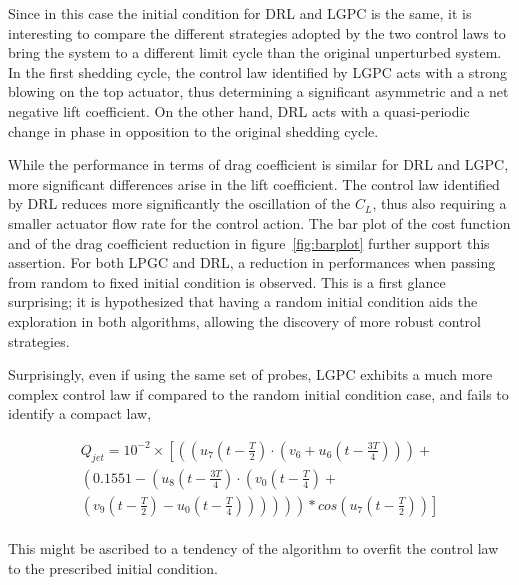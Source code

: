 Since in this case the initial condition for DRL and LGPC is the same, it is interesting to compare the different strategies adopted by the two control laws to bring the system to a different limit cycle than the original unperturbed system. In the first shedding cycle, the control law identified by LGPC acts with a strong blowing on the top actuator, thus determining a significant asymmetric and a net negative lift coefficient. On the other hand, DRL acts with a quasi-periodic change in phase in opposition to the original shedding cycle.

While the performance in terms of drag coefficient is similar for DRL and LGPC, more significant differences arise in the lift coefficient. The control law identified by DRL reduces more significantly the oscillation of the $C_L$, thus also requiring a smaller actuator flow rate for the control action. The bar plot of the cost function and of the drag coefficient reduction in figure~\ref{fig:barplot} further support this assertion. For both LPGC and DRL, a reduction in performances when passing from random to fixed initial condition is observed. This is a first glance surprising; it is hypothesized that having a random initial condition aids the exploration in both algorithms, allowing the discovery of more robust control strategies.

Surprisingly, even if using the same set of probes, LGPC exhibits a much more complex control law if compared to the random initial condition case, and fails to identify a compact law,

\begin{equation*}
    \begin{split}
        Q_{jet} = 10^{-2} \times \left[
        \left(\left(u_7\left(t-\frac{T}{2}\right) \cdot \left(v_6+u_6\left(t-\frac{3T}{4}\right)\right)\right)+ \right.\right. \\
        \left.\left. \left(0.1551-\left(u_8\left(t-\frac{3T}{4}\right) \cdot \left(v_0\left(t-\frac{T}{4}\right) \right.\right.\right.\right.\right.+ \\
        \left.\left.\left.\left.\left. \left(v_9\left(t-\frac{T}{2}\right)-u_0\left(t-\frac{T}{4}\right)\right)\right)\right)\right)\right)*cos\left(u_7\left(t-\frac{T}{2}\right)\right)\right]
    \end{split}
\end{equation*}\\

This might be ascribed to a tendency of the algorithm to overfit the control law to the prescribed initial condition.\\
\vspace{1cm}
